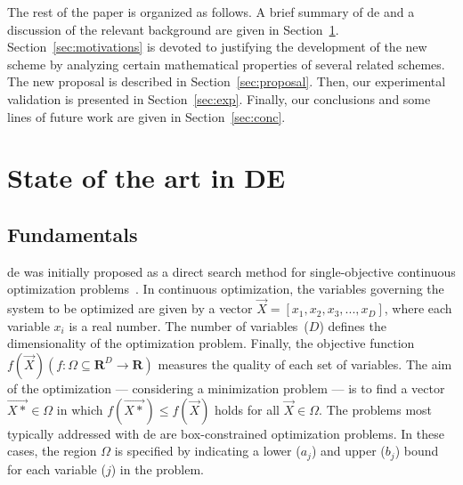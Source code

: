 \documentclass[preprint,3p]{elsarticle}
\newcommand{\DE}{{\sc de}}
\begin{document}
The rest of the paper is organized as follows.
%
A brief summary of \DE{} and a discussion of the relevant background are given in Section~\ref{sec:state_de}.
%
Section~\ref{sec:motivations} is devoted to justifying the development of the new scheme by analyzing certain mathematical properties
of several related schemes.
%
The new proposal is described in Section~\ref{sec:proposal}.
%
Then, our experimental validation is presented in Section~\ref{sec:exp}.
%
Finally, our conclusions and some lines of future work are given in Section~\ref{sec:conc}.

\section{State of the art in DE}
\label{sec:state_de}

\subsection{Fundamentals}

\DE{} was initially proposed as a direct search method for single-objective
continuous optimization problems~\cite{Storn:97}.
%
In continuous optimization, the variables governing the system to be optimized are given by a vector
$\vec{X} = [x_{1}, x_{2}, x_{3}, ..., x_{D}]$, where each variable $x_{i}$ is a real number.
%
The number of variables~($D$) defines the dimensionality of the optimization problem.
%
Finally, the objective function $f(\vec{X})(f:\Omega \subseteq \mathbf{R}^{D} \to \mathbf{R})$ measures the quality of each set of variables.
%
The aim of the optimization --- considering a minimization problem --- is to find a vector
$\vec{X*} \in \Omega$ in which $f(\vec{X*}) \leq f(\vec{X})$ holds for all $\vec{X} \in \Omega$.
%
The problems most typically addressed with \DE{} are box-constrained optimization problems.
%
In these cases, the region $\Omega$ is specified by indicating a lower ($a_j$) and
upper ($b_j$) bound for each variable ($j$) in the problem.
%
\end{document}
